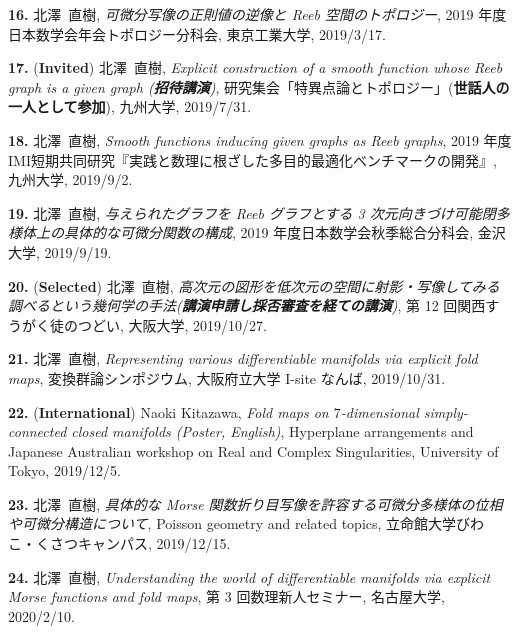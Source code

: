 \documentclass{article}
\begin{document}
\par\noindent
{\bf 16.} 北澤\ 直樹, \textsl{可微分写像の正則値の逆像と Reeb 空間のトポロジー}, 2019 年度日本数学会年会トポロジー分科会, 東京工業大学,  2019/3/17.

\par\noindent
{\bf 17.} ({\bf  Invited}) 北澤\ 直樹, \textsl{Explicit construction of a smooth function whose Reeb graph is a given graph {\rm (}{\bf 招待講演}{\rm )}}, 研究集会「特異点論とトポロジー」({\bf 世話人の一人として参加}), 九州大学,  2019/7/31.

\par\noindent
{\bf 18.} 北澤\ 直樹, \textsl{Smooth functions inducing given graphs as Reeb graphs}, 2019 年度IMI短期共同研究『実践と数理に根ざした多目的最適化ベンチマークの開発』, 九州大学,  2019/9/2.

\par\noindent
{\bf 19.} 北澤\ 直樹, \textsl{与えられたグラフを Reeb グラフとする 3 次元向きづけ可能閉多様体上の具体的な可微分関数の構成}, 2019 年度日本数学会秋季総合分科会, 金沢大学,  2019/9/19.

\par\noindent
{\bf 20.} ({\bf Selected}) 北澤\ 直樹, \textsl{高次元の図形を低次元の空間に射影・写像してみる調べるという幾何学の手法{\rm (}{\bf 講演申請し採否審査を経ての講演}{\rm )}}, 第 12 回関西すうがく徒のつどい, 大阪大学,  2019/10/27.

\par\noindent
{\bf 21.} 北澤\ 直樹, \textsl{Representing various differentiable manifolds via explicit fold maps}, 変換群論シンポジウム, 大阪府立大学 I-site なんば,  2019/10/31.

\par\noindent
{\bf 22.} ({\bf International}) Naoki Kitazawa, \textsl{Fold maps on $7$-dimensional simply-connected closed manifolds {\rm (}Poster, English{\rm )}}, Hyperplane arrangements and Japanese Australian workshop on Real and Complex Singularities, University of Tokyo,  2019/12/5.

\par\noindent
{\bf 23.} 北澤\ 直樹, \textsl{具体的な Morse 関数折り目写像を許容する可微分多様体の位相や可微分構造について}, Poisson geometry and related topics, 立命館大学びわこ・くさつキャンパス,  2019/12/15.

\par\noindent
{\bf 24.} 北澤\ 直樹, \textsl{Understanding the world of differentiable manifolds via  explicit Morse functions and fold maps}, 第 3 回数理新人セミナー, 名古屋大学,  2020/2/10.
\end{document}
